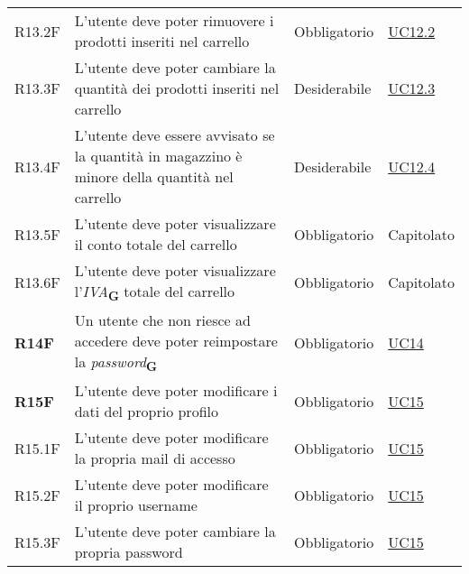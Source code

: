\begin{center}
\begin{longtable}[!h]{p{50px} p{245px} p{75px} p{50px}}
        R13.2F                                & L'utente deve poter rimuovere i prodotti inseriti nel carrello                                             & Obbligatorio             & \hyperref[sec:UC12.2]{UC12.2}                \\
        R13.3F                                & L'utente deve poter cambiare la quantità dei prodotti inseriti nel carrello                                & Desiderabile             & \hyperref[sec:UC12.3]{UC12.3}                \\
        R13.4F                                & L'utente deve essere avvisato se la quantità in magazzino è minore della quantità nel carrello             & Desiderabile             & \hyperref[sec:UC12.4]{UC12.4}                \\
        R13.5F                                & L'utente deve poter visualizzare il conto totale del carrello                                              & Obbligatorio             & Capitolato                                   \\
        R13.6F                                & L'utente deve poter visualizzare l'\textit{IVA}\textsubscript{\textbf{G}} totale del carrello              & Obbligatorio             & Capitolato                                   \\
        \textbf{R14F}                         & Un utente che non riesce ad accedere deve poter reimpostare la \textit{password}\textsubscript{\textbf{G}} & Obbligatorio             & \hyperref[sec:UC14]{UC14}                    \\
        \textbf{R15F}                         & L'utente deve poter modificare i dati del proprio profilo                                                  & Obbligatorio             & \hyperref[sec:UC15]{UC15}                    \\
        R15.1F                                & L'utente deve poter modificare la propria mail di accesso                                                  & Obbligatorio             & \hyperref[sec:UC15]{UC15}                    \\
        R15.2F                                & L'utente deve poter modificare il proprio username                                                         & Obbligatorio             & \hyperref[sec:UC15]{UC15}                    \\
        R15.3F                                & L'utente deve poter cambiare la propria password                                                           & Obbligatorio             & \hyperref[sec:UC15]{UC15}                    \\

\end{longtable}
\end{center}
